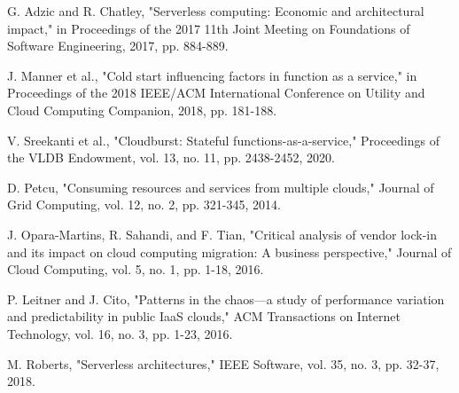 \documentclass[onecolumn]{IEEEtran}
\begin{document}
\begin{thebibliography}{15}
G. Adzic and R. Chatley, "Serverless computing: Economic and architectural impact," in Proceedings of the 2017 11th Joint Meeting on Foundations of Software Engineering, 2017, pp. 884-889.

J. Manner et al., "Cold start influencing factors in function as a service," in Proceedings of the 2018 IEEE/ACM International Conference on Utility and Cloud Computing Companion, 2018, pp. 181-188.

V. Sreekanti et al., "Cloudburst: Stateful functions-as-a-service," Proceedings of the VLDB Endowment, vol. 13, no. 11, pp. 2438-2452, 2020.

D. Petcu, "Consuming resources and services from multiple clouds," Journal of Grid Computing, vol. 12, no. 2, pp. 321-345, 2014.

J. Opara-Martins, R. Sahandi, and F. Tian, "Critical analysis of vendor lock-in and its impact on cloud computing migration: A business perspective," Journal of Cloud Computing, vol. 5, no. 1, pp. 1-18, 2016.

P. Leitner and J. Cito, "Patterns in the chaos—a study of performance variation and predictability in public IaaS clouds," ACM Transactions on Internet Technology, vol. 16, no. 3, pp. 1-23, 2016.

M. Roberts, "Serverless architectures," IEEE Software, vol. 35, no. 3, pp. 32-37, 2018.

\end{thebibliography}
\end{document}
